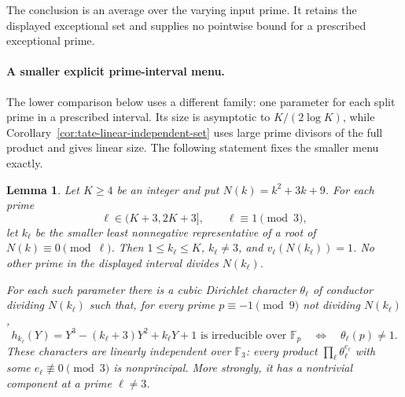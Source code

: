 \documentclass[11pt]{article}
\newtheorem{lemma}[theorem]{Lemma}
\theoremstyle{definition}
\theoremstyle{remark}
\begin{document}
The conclusion is an average over the varying input prime.
It retains the displayed exceptional set and supplies no
pointwise bound for a prescribed exceptional prime.


\paragraph{A smaller explicit prime-interval menu.}
The lower comparison below uses a different family: one parameter for
each split prime in a prescribed interval.  Its size is asymptotic to
$K/(2\log K)$, while Corollary~\ref{cor:tate-linear-independent-set}
uses large prime divisors of the full product and gives linear size.
The following statement fixes the smaller menu exactly.

\begin{lemma}\label{lem:tate-private-prime-menu}
Let $K\ge4$ be an integer and put $N(k)=k^2+3k+9$.
For each prime
\[
 \ell\in(K+3,2K+3],\qquad \ell\equiv1\pmod3,
\]
let $k_\ell$ be the smaller least nonnegative representative of a
root of $N(k)\equiv0\pmod\ell$.  Then $1\le k_\ell\le K$,
$k_\ell\ne3$, and $v_\ell(N(k_\ell))=1$.
No other prime in the displayed interval divides $N(k_\ell)$.

For each such parameter there is a cubic Dirichlet character
$\theta_\ell$ of conductor dividing $N(k_\ell)$ such that, for
every prime $p\equiv-1\pmod9$ not dividing $N(k_\ell)$,
\[
 h_{k_\ell}(Y)=Y^3-(k_\ell+3)Y^2+k_\ell Y+1
 \text{ is irreducible over }\mathbb F_p
 \quad\Longleftrightarrow\quad \theta_\ell(p)\ne1.
\]
These characters are linearly independent over $\mathbb F_3$:
every product $\prod_\ell\theta_\ell^{e_\ell}$ with some
$e_\ell\not\equiv0\pmod3$ is nonprincipal.  More strongly,
it has a nontrivial component at a prime $\ell\ne3$.
\end{lemma}
\end{document}
